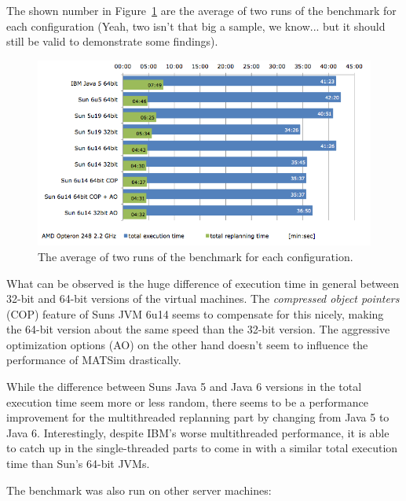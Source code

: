 The shown number in Figure~\ref{fig:Benchmark01} are the average of two runs of the benchmark for each configuration (Yeah, two isn't that big a sample, we know... but it should still be valid to demonstrate some findings).
\begin{figure}[h]
\centering
\includegraphics[width=0.75\linewidth]{figures/benchmarks/benchmark1}
\caption{The average of two runs of the benchmark for each configuration.}
\label{fig:Benchmark01}
\end{figure}
What can be observed is the huge difference of execution time in general between 32-bit and 64-bit versions of the virtual machines. The \emph{compressed object pointers} (COP) feature of Suns JVM 6u14 seems to compensate for this nicely, making the 64-bit version about the same speed than the 32-bit version. The aggressive optimization options (AO) on the other hand doesn't seem to influence the performance of MATSim drastically.

While the difference between Suns Java 5 and Java 6 versions in the total execution time seem more or less random, there seems to be a performance improvement for the multithreaded replanning part by changing from Java 5 to Java 6. Interestingly, despite IBM's worse multithreaded performance, it is able to catch up in the single-threaded parts to come in with a similar total execution time than Sun's 64-bit JVMs.

The benchmark was also run on other server machines:

